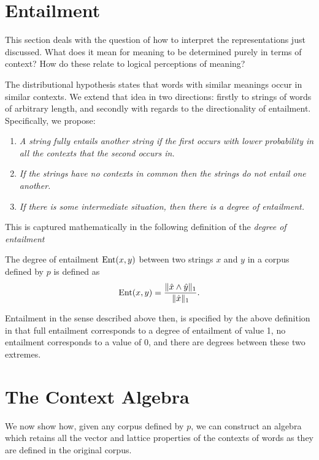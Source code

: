 \documentclass[12pt]{report}
\begin{document}


\section{Entailment}

This section deals with the question of how to interpret the representations just discussed. What does it mean for meaning to be determined purely in terms of context? How do these relate to logical perceptions of meaning?

The distributional hypothesis states that words with similar meanings occur in similar contexts. We extend that idea in two directions: firstly to strings of words of arbitrary length, and secondly with regards to the directionality of entailment. Specifically, we propose:
\begin{enumerate}
\item \emph{A string fully entails another string if the first occurs with lower probability in all the contexts that the second occurs in.}
\item \emph{If the strings have no contexts in common then the strings do not entail one another.}
\item \emph{If there is some intermediate situation, then there is a \emph{degree} of entailment.}
\end{enumerate}
This is captured mathematically in the following definition of the \emph{degree of entailment}
\begin{defn}
The degree of entailment $\operatorname{Ent}(x,y)$ between two strings $x$ and $y$ in a corpus defined by $p$ is defined as
$$\operatorname{Ent}(x,y) = \frac{\|\hat{x}\land\hat{y}\|_1}{\|\hat{x}\|_1}.$$
\end{defn}
Entailment in the sense described above then, is specified by the above definition in that full entailment corresponds to a degree of entailment of value 1, no entailment corresponds to a value of 0, and there are degrees between these two extremes.

\section{The Context Algebra}

We now show how, given any corpus defined by $p$, we can construct an algebra which retains all the vector and lattice properties of the contexts of words as they are defined in the original corpus.
\end{document}
